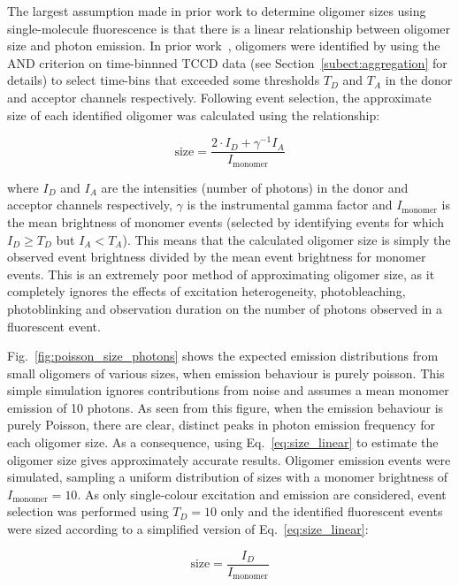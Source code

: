 The largest assumption made in prior work to determine oligomer sizes using single-molecule fluorescence is that there is a linear relationship between oligomer size and photon emission. In prior work~\cite{cremades2012}, oligomers were identified by using the AND criterion on time-binnned TCCD data (see Section~\ref{subect:aggregation} for details) to select time-bins that exceeded some thresholds $T_D$ and $T_A$ in the donor and acceptor channels respectively. Following event selection, the approximate size of each identified oligomer was calculated using the relationship:

\begin{equation}
\text{size} = \frac{2\cdot I_D + \gamma^{-1} I_A}{I_{\text{monomer}}}
\label{eq:size_linear}
\end{equation}

where $I_D$ and $I_A$ are the intensities (number of photons) in the donor and acceptor channels respectively, $\gamma$ is the instrumental gamma factor and $I_{\text{monomer}}$ is the mean brightness of monomer events (selected by identifying events for which $I_D \geq T_D$ but $I_A < T_A$). This means that the calculated oligomer size is simply the observed event brightness divided by the mean event brightness for monomer events. This is an extremely poor method of approximating oligomer size, as it completely ignores the effects of excitation heterogeneity, photobleaching, photoblinking and observation duration on the number of photons observed in a fluorescent event.

Fig.~\ref{fig:poisson_size_photons} shows the expected emission distributions from small oligomers of various sizes, when emission behaviour is purely poisson. This simple simulation ignores contributions from noise and assumes a mean monomer emission of 10 photons. As seen from this figure, when the emission behaviour is purely Poisson, there are clear, distinct peaks in photon emission frequency for each oligomer size. As a consequence, using Eq.~\ref{eq:size_linear} to estimate the oligomer size gives approximately accurate results. Oligomer emission events were simulated, sampling a uniform distribution of sizes with a monomer brightness of $I_{\text{monomer}} = 10$. As only single-colour excitation and emission are considered, event selection was performed using $T_D = 10$ only and the identified fluorescent events were sized according to a simplified version of Eq.~\ref{eq:size_linear}:

\begin{equation}
\text{size} = \frac{I_D}{I_{\text{monomer}}}
\label{eq:size_linear_simple}
\end{equation}

